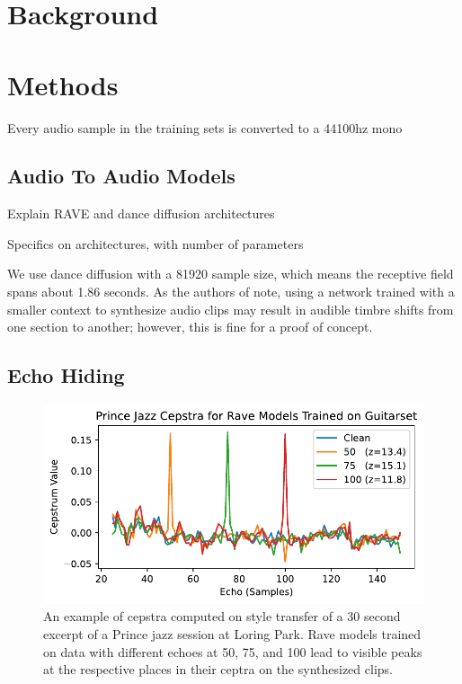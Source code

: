 \documentclass[letterpaper]{article} %
\begin{document}
\section{Background}



\section{Methods}

Every audio sample in the training sets is converted to a 44100hz mono 

\subsection{Audio To Audio Models}

Explain RAVE and dance diffusion architectures

Specifics on architectures, with number of parameters

We use dance diffusion with a 81920 sample size, which means the receptive field spans about 1.86 seconds.  As the authors of \cite{hawthornemulti} note, using a network trained with a smaller context to synthesize audio clips may result in audible timbre shifts from one section to another; however, this is fine for a proof of concept.


\subsection{Echo Hiding}
\label{sec:echohiding}

\begin{figure}
    \centering
    \includegraphics[width=\columnwidth]{figs/RaveCepstra.pdf}
    \caption{An example of cepstra computed on style transfer of a 30 second excerpt of a Prince jazz session at Loring Park.  Rave models trained on data with different echoes at 50, 75, and 100 lead to visible peaks at the respective places in their ceptra on the synthesized clips.}
    \label{fig:ravecepstra}
\end{figure}
\end{document}
